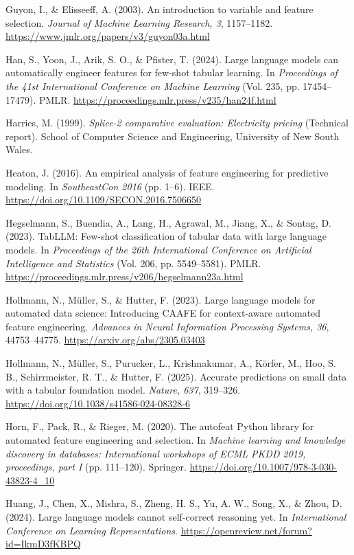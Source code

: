 \documentclass[11pt]{article}
\begin{document}
Guyon, I., \& Elisseeff, A. (2003). An introduction to variable and feature selection. \emph{Journal
of Machine Learning Research, 3}, 1157--1182. \url{https://www.jmlr.org/papers/v3/guyon03a.html}

Han, S., Yoon, J., Arik, S. O., \& Pfister, T. (2024). Large language models can automatically
engineer features for few-shot tabular learning. In \emph{Proceedings of the 41st International
Conference on Machine Learning} (Vol. 235, pp. 17454--17479). PMLR.
\url{https://proceedings.mlr.press/v235/han24f.html}

Harries, M. (1999). \emph{Splice-2 comparative evaluation: Electricity pricing} (Technical report).
School of Computer Science and Engineering, University of New South Wales.

Heaton, J. (2016). An empirical analysis of feature engineering for predictive modeling. In
\emph{SoutheastCon 2016} (pp. 1--6). IEEE. \url{https://doi.org/10.1109/SECON.2016.7506650}

Hegselmann, S., Buendia, A., Lang, H., Agrawal, M., Jiang, X., \& Sontag, D. (2023). TabLLM:
Few-shot classification of tabular data with large language models. In \emph{Proceedings of the 26th
International Conference on Artificial Intelligence and Statistics} (Vol. 206, pp. 5549--5581). PMLR.
\url{https://proceedings.mlr.press/v206/hegselmann23a.html}

Hollmann, N., Müller, S., \& Hutter, F. (2023). Large language models for automated data science:
Introducing CAAFE for context-aware automated feature engineering. \emph{Advances in Neural
Information Processing Systems, 36}, 44753--44775. \url{https://arxiv.org/abs/2305.03403}

Hollmann, N., Müller, S., Purucker, L., Krishnakumar, A., Körfer, M., Hoo, S. B., Schirrmeister, R.
T., \& Hutter, F. (2025). Accurate predictions on small data with a tabular foundation model.
\emph{Nature, 637}, 319--326. \url{https://doi.org/10.1038/s41586-024-08328-6}

Horn, F., Pack, R., \& Rieger, M. (2020). The autofeat Python library for automated feature
engineering and selection. In \emph{Machine learning and knowledge discovery in databases:
International workshops of ECML PKDD 2019, proceedings, part I} (pp. 111--120). Springer.
\url{https://doi.org/10.1007/978-3-030-43823-4_10}

Huang, J., Chen, X., Mishra, S., Zheng, H. S., Yu, A. W., Song, X., \& Zhou, D. (2024). Large
language models cannot self-correct reasoning yet. In \emph{International Conference on Learning
Representations}. \url{https://openreview.net/forum?id=IkmD3fKBPQ}
\end{document}
